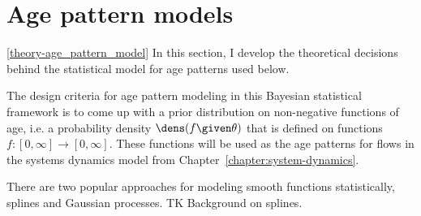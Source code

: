 \section{Age pattern models}
\ref{theory-age_pattern_model}
In this section, I develop the theoretical decisions behind the
statistical model for age patterns used below.

The design criteria for age pattern modeling in this Bayesian
statistical framework is to come up with a prior distribution on
non-negative functions of age, i.e. a probability density
$\dens(f\given\theta)$ that is defined on functions
$f:[0,\infty]\rightarrow[0,\infty]$.  These functions will be used as
the age patterns for flows in the systems dynamics model from
Chapter~\ref{chapter:system-dynamics}.

There are two popular approaches for modeling smooth functions
statistically, splines and Gaussian processes. TK Background on
splines.

